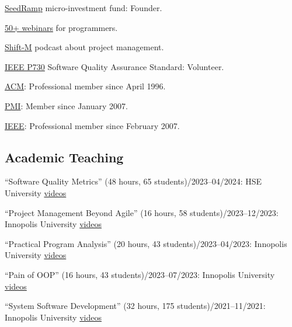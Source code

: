 \documentclass{yb}
\begin{document}
\href{https://www.seedramp.com/}{SeedRamp} micro-investment fund: Founder.

\href{https://www.yegor256.com/webinars.html}{50+ webinars} for programmers.

\href{https://www.yegor256.com/shift-m.html}{Shift-M} podcast about project management.

\href{http://ieeexplore.ieee.org/document/6835311/}{IEEE P730} Software Quality Assurance Standard: Volunteer.

\href{https://www.acm.org}{ACM}: Professional member since April 1996.

\href{https://certification.pmi.org/registry.aspx}{PMI}: Member since January 2007.

\href{https://www.ieee.org}{IEEE}: Professional member since February 2007.

\subsection*{Academic Teaching}

``Software Quality Metrics'' (48 hours, 65 students)/2023--04/2024: HSE University\newline
\href{https://www.youtube.com/playlist?list=PLaIsQH4uc08xyXRhhYPHh-Yam2kEwNaLl}{videos}

``Project Management Beyond Agile'' (16 hours, 58 students)/2023--12/2023: Innopolis University\newline
\href{https://www.youtube.com/playlist?list=PLaIsQH4uc08x_T-Aelduv3Zf0DWRx40pq}{videos}

``Practical Program Analysis'' (20 hours, 43 students)/2023--04/2023: Innopolis University\newline
\href{https://www.youtube.com/playlist?list=PLaIsQH4uc08wdXIC4utfgMxV_iswE9_Md}{videos}

``Pain of OOP'' (16 hours, 43 students)/2023--07/2023: Innopolis University\newline
\href{https://www.youtube.com/playlist?list=PLaIsQH4uc08ytf8POIIAkkR4ZsRq8DFiV}{videos}

``System Software Development'' (32 hours, 175 students)/2021--11/2021: Innopolis University\newline
\href{https://www.youtube.com/playlist?list=PLaIsQH4uc08woJKRAA7mmjs9fU0jeKjjM}{videos}
\end{document}
